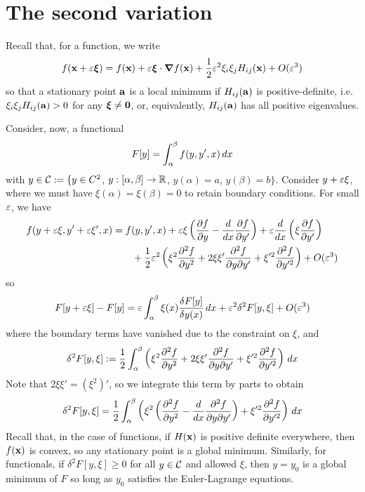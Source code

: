 \documentclass{../../template/note}
\begin{document}
    \section{The second variation}

    Recall that, for a function, we write
    \begin{align*}
        f(\V x + \eps \V \xi) = f(\V x) + \eps \V \xi \cdot \grad f(\V x) + \frac 1 2 \eps^2 \xi_i \xi_j H_{ij}(\V x) + O(\eps^3)
    \end{align*}
    so that a stationary point $\V a$ is a local minimum if $H_{ij}(\V a)$ is positive-definite, i.e. $\xi_i \xi_j H_{ij}(\V a) > 0$ for any $\V \xi \neq \V 0$, or, equivalently, $H_{ij}(\V a)$ has all positive eigenvalues.

    Consider, now, a functional
    \begin{align*}
        F[y] = \int_{\alpha}^{\beta} f(y, y', x) \,d{x}
    \end{align*}
    with $y \in \mathcal{C} := \{y \in C^2$, $y: [\alpha, \beta] \to \mathbb R$, $y(\alpha) = a$, $y(\beta) = b\}$. Consider $y + \varepsilon \xi$, where we must have $\xi(\alpha) = \xi(\beta) = 0$ to retain boundary conditions. For small $\varepsilon$, we have
    \begin{align*}
        f(y + \eps \xi, y' + \eps \xi', x) &= f(y, y', x) + \eps \xi\left(\pd{f}{y} - \frac{d}{dx} \pd{f}{y'}\right) + \eps \frac{d}{dx}\left(\xi \pd{f}{y'}\right) \\
        &\qquad + \frac 1 2 \eps^2 \left(\xi^2 \pd{^2f}{y^2} + 2\xi \xi' \pd{^2f}{y\pr y'} + \xi'^2 \pd{^2f}{y'^2}\right) + O(\eps^3)
    \end{align*}
    so
    \begin{align*}
        F[y+\varepsilon \xi] - F[y] = \varepsilon \int_\alpha^\beta \xi(x) \frac{\delta F[y]}{\delta y(x)} \,d{x} + \varepsilon^2 \delta^2F[y, \xi] + O(\varepsilon^3)
    \end{align*}
    where the boundary terms have vanished due to the constraint on $\xi$, and
    \begin{align*}
        \delta^2 F[y, \xi] := \frac 1 2 \int_\alpha^\beta \left(\xi^2 \pd{^2f}{y^2} + 2\xi \xi' \pd{^2f}{y\pr y'} + \xi'^2 \pd{^2f}{y'^2}\right) \D x
    \end{align*}
    Note that $2 \xi \xi' = (\xi^2)'$, so we integrate this term by parts to obtain
    \begin{align*}
        \delta^2 F[y, \xi] = \frac 1 2 \int_\alpha^\beta \left(\xi^2 \left(\pd{^2f}{y^2} - \frac{d}{dx} \pd{^2f}{y \pr y'}\right) + \xi'^2 \pd{^2f}{y'^2}\right) \D x
    \end{align*}
    Recall that, in the case of functions, if $H(\V x)$ is positive definite everywhere, then $f(\V x)$ is convex, so any stationary point is a global minimum. Similarly, for functionals, if $\delta^2 F[y, \xi] \geq 0$ for all $y \in \mathcal{C}$ and allowed $\xi$, then $y = y_0$ is a global minimum of $F$ so long as $y_0$ satisfies the Euler-Lagrange equations.
    
\end{document}
